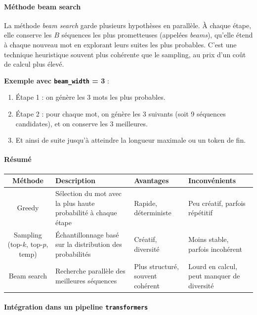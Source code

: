 \documentclass[a4paper,11pt]{article}
\begin{document}
\paragraph{Méthode beam search}

La méthode \textit{beam search} garde plusieurs hypothèses en parallèle. À chaque étape, elle conserve les $B$ séquences les plus prometteuses (appelées \textit{beams}), qu’elle étend à chaque nouveau mot en explorant leurs suites les plus probables. C’est une technique heuristique souvent plus cohérente que le sampling, au prix d’un coût de calcul plus élevé.

\textbf{Exemple avec \texttt{beam\_width} = 3} :
\begin{enumerate}
  \item Étape 1 : on génère les 3 mots les plus probables.
  \item Étape 2 : pour chaque mot, on génère les 3 suivants (soit 9 séquences candidates), et on conserve les 3 meilleures.
  \item Et ainsi de suite jusqu’à atteindre la longueur maximale ou un token de fin.
\end{enumerate}

\paragraph{Résumé}

\begin{center}
\begin{tabular}{|c|p{3.5cm}|p{3.5cm}|p{3.5cm}|}
\hline
\textbf{Méthode} & \textbf{Description} & \textbf{Avantages} & \textbf{Inconvénients} \\
\hline
Greedy & Sélection du mot avec la plus haute probabilité à chaque étape & Rapide, déterministe & Peu créatif, parfois répétitif \\
\hline
Sampling (top-$k$, top-$p$, temp) & Échantillonnage basé sur la distribution des probabilités & Créatif, diversité & Moins stable, parfois incohérent \\
\hline
Beam search & Recherche parallèle des meilleures séquences & Plus structuré, souvent cohérent & Lourd en calcul, peut manquer de diversité \\
\hline
\end{tabular}
\end{center}

\paragraph{Intégration dans un pipeline \texttt{transformers}}
\end{document}
